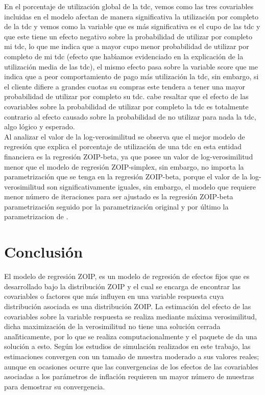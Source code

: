 En el porcentaje de utilizaci\'{o}n global de la tdc, vemos como las tres covariables incluidas en el modelo afectan de manera significativa la utilizaci\'{o}n por completo de la tdc y vemos como la variable que es m\'{a}s significativa es el cupo de las tdc y que este tiene un efecto negativo sobre la probabilidad de utilizar por completo mi tdc, lo que me indica que a mayor cupo menor probabilidad de utilizar por completo de mi tdc (efecto que hab\'{\i}amos evidenciado en la explicaci\'{o}n de la utilizaci\'{o}n media de las tdc), el mismo efecto pasa sobre la variable score que me indica que a peor comportamiento de pago m\'{a}s utilizaci\'{o}n la tdc, sin embargo, si el cliente difiere a grandes cuotas su compras este tendera a tener una mayor probabilidad de utilizar por completo su tdc. cabe resaltar que el efecto de las covariables sobre la probabilidad de utilizar por completo la tdc es totalmente contrario al efecto causado sobre la probabilidad de no utilizar para nada la tdc, algo l\'{o}gico y esperado.\\

Al analizar el valor de la log-verosimilitud se observa que el mejor modelo de regresi\'{o}n que explica el porcentaje de utilizaci\'{o}n de una tdc en esta entidad financiera es la regresi\'{o}n ZOIP-beta, ya que posee un valor de log-verosimilitud menor que el modelo de regresi\'{o}n ZOIP-simplex, sin embargo, no importa la parametrizaci\'{o}n que se tenga en la regresi\'{o}n ZOIP-beta, porque el valor de la log-verosimilitud son significativamente iguales, sin embargo, el modelo que requiere menor n\'{u}mero de iteraciones para ser ajustado es la regresi\'{o}n ZOIP-beta parametrizaci\'{o}n \cite{Ferrari2} seguido por la parametrizaci\'{o}n original y por \'{u}ltimo la parametrizacion de \cite{Stasinopoulos2}.



\section{Conclusi\'{o}n}

El modelo de regresi\'{o}n ZOIP, es un modelo de regresi\'{o}n de efectos fijos que es desarrollado bajo la distribuci\'{o}n ZOIP y el cual se encarga de encontrar las covariables o factores que m\'{a}s influyen en una variable respuesta cuya distribuci\'{o}n asociada es una distribuci\'{o}n ZOIP. La estimaci\'{o}n del efecto de las covariables sobre la variable respuesta se realiza mediante m\'{a}xima verosimilitud, dicha maximizaci\'{o}n de la verosimilitud no tiene una soluci\'{o}n cerrada anal\'{\i}ticamente, por lo que se realiza computacionalmente y el paquete  de  da una soluci\'{o}n a esto. Seg\'{u}n los estudios de simulaci\'{o}n realizados en este trabajo, las estimaciones convergen con un tama\~{n}o de muestra moderado a sus valores reales; aunque en ocasiones ocurre que las convergencias de los efectos de las covariables asociadas a los par\'{a}metros de inflaci\'{o}n requieren un mayor n\'{u}mero de muestras para demostrar su convergencia.\\

